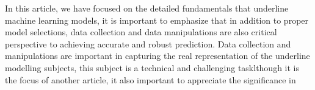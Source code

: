 
\par
In this article, we have focused on the detailed fundamentals that underline machine learning models, it is important to emphasize that in addition to proper model selections, data collection and data manipulations are also critical perspective to achieving accurate and robust prediction. Data collection and manipulations are important in capturing the real representation of the underline modelling subjects, this subject is a technical and challenging tasklthough it is the focus of another article, it also important to appreciate the significance in 
\par 
